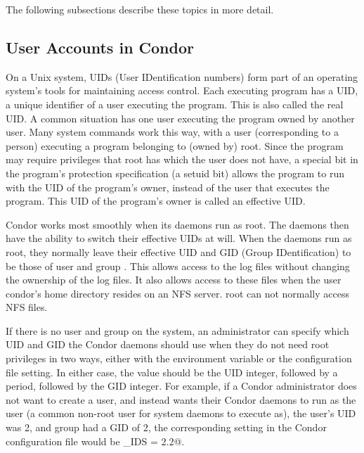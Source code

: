 The following subsections describe these topics in more detail. 

\subsection{\label{sec:uids}User Accounts in Condor}


On a Unix system,
UIDs (User IDentification numbers) form part of an operating system's
tools for maintaining access control.
Each executing program has a UID,
a unique identifier of a user executing the program.
This is also called the real UID.
A common situation has one user executing the program owned
by another user.
Many system commands work this way, with a user (corresponding
to a person) executing a program belonging to (owned by) root.
Since the program may require privileges that root has which
the user does not have, a special bit in the program's
protection specification (a setuid bit) allows the program
to run with the UID of the program's owner, instead of the
user that executes the program.
This UID of the program's owner is called an effective UID.

Condor works most smoothly when its daemons run as root.
The daemons then have the ability to switch their 
effective UIDs at will.
When the daemons run as root,
they normally leave their effective UID and GID (Group IDentification)
to be those of user and group \verb@condor@.
This allows access to the log files without
changing the ownership of the log files.
It also allows access to these files when
the user condor's home directory resides on an NFS server.
root can not normally access NFS files.

If there is no \verb@condor@ user and group on the system, an
administrator can specify which UID and GID the Condor daemons should
use when they do not need root privileges in two ways, 
either with the  environment variable or the
 configuration file setting.
In either case, the value should be the UID integer, followed by a
period, followed by the GID integer.
For example, if a Condor administrator does not want to create a
\verb@condor@ user, and instead wants their Condor daemons to run as
the \verb@daemon@ user (a common non-root user for system daemons to
execute as), the \verb@daemon@ user's UID was 2, and group
\verb@daemon@ had a GID of 2, the corresponding setting in the Condor
configuration file would be \verb@CONDOR_IDS = 2.2@.

